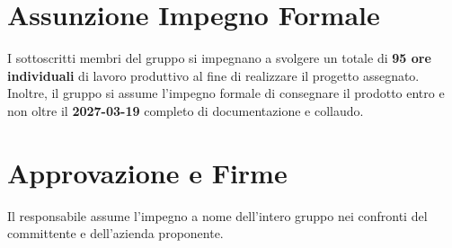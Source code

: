 \section{Assunzione Impegno Formale}
I sottoscritti membri del gruppo {\nomegruppo} si impegnano a svolgere un totale di \textbf{95 ore individuali} di lavoro produttivo al fine di realizzare il progetto assegnato. Inoltre, il gruppo si assume l'impegno formale di consegnare il prodotto entro e non oltre il \textbf{2027-03-19} completo di documentazione e collaudo. 

\section{Approvazione e Firme}
Il responsabile assume l'impegno a nome dell'intero gruppo nei confronti del committente e dell'azienda proponente.
\vspace{2em}
\newline
\vspace{2em}
\noindent
\noindent\hfill{}
